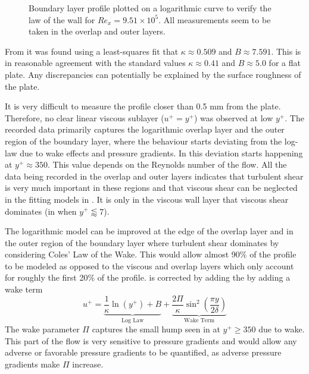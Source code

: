 \documentclass{article}
\begin{document}
\begin{figure}[H]
    \centering
    
    \caption{Boundary layer profile plotted on a logarithmic curve to verify the law of the wall for $Re_x = 9.51 \times 10^5$. All measurements seem to be taken in the overlap and outer layers.}
    \label{fig:log_law}
\end{figure}

From  it was found using a least-squares fit that $\kappa \approx 0.509$ and $B \approx 7.591$. This is in reasonable agreement with the standard values $\kappa \approx 0.41$ and $B \approx 5.0$ for a flat plate. Any discrepancies can potentially be explained by the surface roughness of the plate.

It is very difficult to measure the profile closer than 0.5 \unit{\mm} from the plate. Therefore, no clear linear viscous sublayer ($u^+ = y^+$) was observed at low $y^+$. The recorded data primarily captures the logarithmic overlap layer and the outer region of the boundary layer, where the behaviour starts deviating from the log-law due to wake effects and pressure gradients. In  this deviation starts happening at $y^+ \approx 350$. This value depends on the Reynolds number of the flow. All the data being recorded in the overlap and outer layers indicates that turbulent shear is very much important in these regions and that viscous shear can be neglected in the fitting models in . It is only in the viscous wall layer that viscous shear dominates (in  when $y^+ \lessapprox 7$).

The logarithmic model can be improved at the edge of the overlap layer and in the outer region of the boundary layer where turbulent shear dominates by considering Coles' Law of the Wake. This would allow almost 90\% of the profile to be modeled as opposed to the viscous and overlap layers which only account for roughly the first 20\% of the profile.  is corrected by adding the by adding a wake term
\begin{equation}
    u^{+} = \underbrace{\frac{1}{\kappa} \ln\left(y^{+}\right) + B}_{\text{Log Law}}
    + \underbrace{\frac{2\Pi}{\kappa} \sin^{2}\left(\frac{\pi y}{2\delta}\right)}_{\text{Wake Term}}
    \label{eq:Coles' wake law}
\end{equation}
The wake parameter $\Pi$ captures the small hump seen in  at $y^+ \ge 350$ due to wake. This part of the flow is very sensitive to pressure gradients and would allow any adverse or favorable pressure gradients to be quantified, as adverse pressure gradients make $\Pi$ increase.
\end{document}
